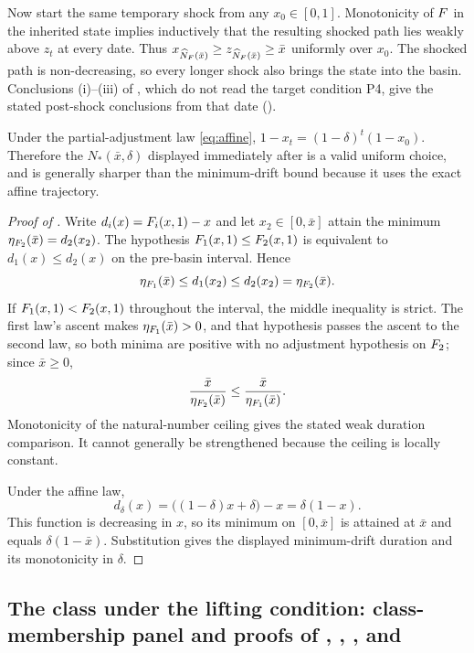 Now start the same temporary shock from any $x_0\in[0,1]$.
Monotonicity of $F$ in the inherited state implies inductively that
the resulting shocked path lies weakly above $z_t$ at every date.
Thus
$x_{\widehat N_{F}(\bar x)}
\ge z_{\widehat N_{F}(\bar x)}\ge\bar x$
uniformly over $x_0$. The shocked path is non-decreasing, so every
longer shock also brings the state into the basin. Conclusions (i)--(iii) of
, which do not read the target condition P4, give the stated
post-shock conclusions from that date
().

Under the partial-adjustment law \eqref{eq:affine},
$1-x_t=(1-\delta)^t(1-x_0)$. Therefore the
$N_*(\bar x,\delta)$ displayed immediately after  is a valid
uniform choice,
and is generally sharper than the minimum-drift bound because it uses
the exact affine trajectory.

\begin{proof}[Proof of ]
Write
$d_i(x)=F_i(x,1)-x$ and let $x_2\in[0,\bar x]$ attain the minimum
$\eta_{F_2}(\bar x)=d_2(x_2)$. The hypothesis $F_1(x,1)\le F_2(x,1)$ is
equivalent to $d_1(x)\le d_2(x)$ on the pre-basin interval. Hence
\[
\eta_{F_1}(\bar x)
\le d_1(x_2)
\le d_2(x_2)
=\eta_{F_2}(\bar x).
\]
If $F_1(x,1)<F_2(x,1)$ throughout the interval, the middle
inequality is strict. The first law's ascent makes $\eta_{F_1}(\bar x)>0$,
and that hypothesis passes the ascent to the second law, so both minima
are positive with no adjustment hypothesis on $F_2$; since $\bar x\ge0$,
\[
\frac{\bar x}{\eta_{F_2}(\bar x)}
\le
\frac{\bar x}{\eta_{F_1}(\bar x)}.
\]
Monotonicity of the natural-number ceiling gives the stated weak
duration comparison. It cannot generally be strengthened because the
ceiling is locally constant.

Under the affine law,
\[
d_\delta(x)
=\bigl((1-\delta)x+\delta\bigr)-x
=\delta(1-x).
\]
This function is decreasing in $x$, so its minimum on
$[0,\bar x]$ is attained at $\bar x$ and equals
$\delta(1-\bar x)$. Substitution gives the displayed
minimum-drift duration and its monotonicity in $\delta$.
\end{proof}

\subsection{The class under the lifting condition: class-membership panel and proofs of
, ,
,  and }
\label{app:proofs:placable}

